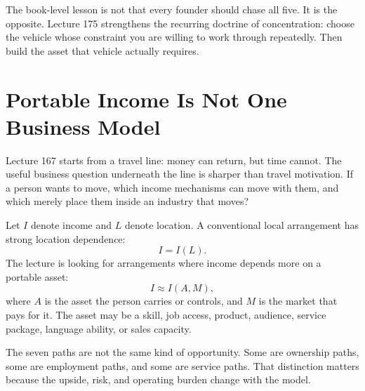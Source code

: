\documentclass[11pt,oneside]{book}
\begin{document}
The book-level lesson is not that every founder should chase all five. It is the opposite. Lecture 175 strengthens the recurring doctrine of concentration: choose the vehicle whose constraint you are willing to work through repeatedly. Then build the asset that vehicle actually requires.


\section{Portable Income Is Not One Business Model}

Lecture 167 starts from a travel line: money can return, but time cannot. The useful business question underneath the line is sharper than travel motivation. If a person wants to move, which income mechanisms can move with them, and which merely place them inside an industry that moves?

Let \(I\) denote income and \(L\) denote location. A conventional local arrangement has strong location dependence:
\[
I=I(L).
\]
The lecture is looking for arrangements where income depends more on a portable asset:
\[
I\approx I(A,M),
\]
where \(A\) is the asset the person carries or controls, and \(M\) is the market that pays for it. The asset may be a skill, job access, product, audience, service package, language ability, or sales capacity.

The seven paths are not the same kind of opportunity. Some are ownership paths, some are employment paths, and some are service paths. That distinction matters because the upside, risk, and operating burden change with the model.
\end{document}
